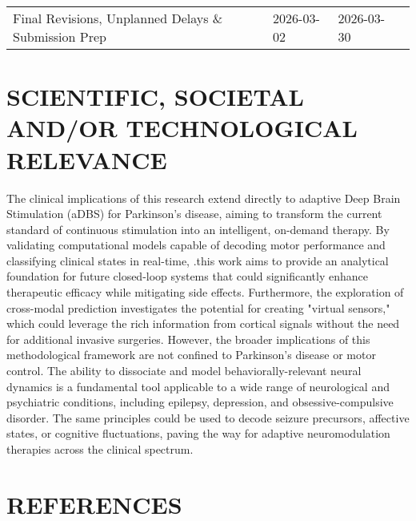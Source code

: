 \documentclass[12pt, a4paper]{article}
\begin{document}
\begin{table}[h!]
{\begin{tabularx}{\textwidth}{>{\RaggedRight}X l l >{\RaggedRight}X}
            Final Revisions, Unplanned Delays \& Submission Prep & 2026-03-02 & 2026-03-30 &                                                                                                                             \\
        \end{tabularx}
    }
\end{table}

\newpage

\section{SCIENTIFIC, SOCIETAL AND/OR TECHNOLOGICAL RELEVANCE}
The clinical implications of this research extend directly to adaptive Deep Brain Stimulation (aDBS) for Parkinson's disease, aiming to transform the current standard of continuous stimulation into an intelligent, on-demand therapy. By validating computational models capable of decoding motor performance and classifying clinical states in real-time, .this work aims to provide an analytical foundation for future closed-loop systems that could significantly enhance therapeutic efficacy while mitigating side effects. Furthermore, the exploration of cross-modal prediction investigates the potential for creating "virtual sensors," which could leverage the rich information from cortical signals without the need for additional invasive surgeries. However, the broader implications of this methodological framework are not confined to Parkinson's disease or motor control. The ability to dissociate and model behaviorally-relevant neural dynamics is a fundamental tool applicable to a wide range of neurological and psychiatric conditions, including epilepsy, depression, and obsessive-compulsive disorder. The same principles could be used to decode seizure precursors, affective states, or cognitive fluctuations, paving the way for adaptive neuromodulation therapies across the clinical spectrum.

\section{REFERENCES}
\printbibliography[heading=none]
\end{document}

